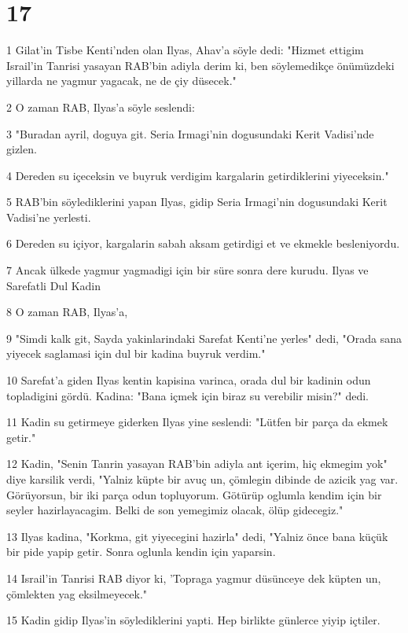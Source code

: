 \chapter{17}

\par 1 Gilat'in Tisbe Kenti'nden olan Ilyas, Ahav'a söyle dedi: "Hizmet ettigim Israil'in Tanrisi yasayan RAB'bin adiyla derim ki, ben söylemedikçe önümüzdeki yillarda ne yagmur yagacak, ne de çiy düsecek."
\par 2 O zaman RAB, Ilyas'a söyle seslendi:
\par 3 "Buradan ayril, doguya git. Seria Irmagi'nin dogusundaki Kerit Vadisi'nde gizlen.
\par 4 Dereden su içeceksin ve buyruk verdigim kargalarin getirdiklerini yiyeceksin."
\par 5 RAB'bin söylediklerini yapan Ilyas, gidip Seria Irmagi'nin dogusundaki Kerit Vadisi'ne yerlesti.
\par 6 Dereden su içiyor, kargalarin sabah aksam getirdigi et ve ekmekle besleniyordu.
\par 7 Ancak ülkede yagmur yagmadigi için bir süre sonra dere kurudu. Ilyas ve Sarefatli Dul Kadin
\par 8 O zaman RAB, Ilyas'a,
\par 9 "Simdi kalk git, Sayda yakinlarindaki Sarefat Kenti'ne yerles" dedi, "Orada sana yiyecek saglamasi için dul bir kadina buyruk verdim."
\par 10 Sarefat'a giden Ilyas kentin kapisina varinca, orada dul bir kadinin odun topladigini gördü. Kadina: "Bana içmek için biraz su verebilir misin?" dedi.
\par 11 Kadin su getirmeye giderken Ilyas yine seslendi: "Lütfen bir parça da ekmek getir."
\par 12 Kadin, "Senin Tanrin yasayan RAB'bin adiyla ant içerim, hiç ekmegim yok" diye karsilik verdi, "Yalniz küpte bir avuç un, çömlegin dibinde de azicik yag var. Görüyorsun, bir iki parça odun topluyorum. Götürüp oglumla kendim için bir seyler hazirlayacagim. Belki de son yemegimiz olacak, ölüp gidecegiz."
\par 13 Ilyas kadina, "Korkma, git yiyecegini hazirla" dedi, "Yalniz önce bana küçük bir pide yapip getir. Sonra oglunla kendin için yaparsin.
\par 14 Israil'in Tanrisi RAB diyor ki, 'Topraga yagmur düsünceye dek küpten un, çömlekten yag eksilmeyecek."
\par 15 Kadin gidip Ilyas'in söylediklerini yapti. Hep birlikte günlerce yiyip içtiler.

